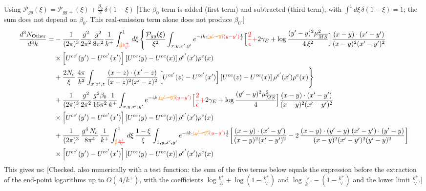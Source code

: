 \documentclass[9pt]{article}
\numberwithin{equation}{section}
\begin{document}
Using $\mathcal{P}_{gg}(\xi) = \mathcal{P}_{gg\,+}(\xi) +\frac{\beta_{0}}{2}\,\delta(1-\xi)$ {\color{red}[The $\beta_{0}$ term is added (first term) and subtracted (third term), with $\int^{1}d\xi\,\delta(1-\xi)=1$; the sum does not depend on $\beta_{0}$. This real-emission term alone does not produce $\beta_{0}$.]}
\begin{align}
\frac{d^{3}N_{\rm Other}}{d^{3}k}= &-\frac{1}{(2\pi)^{3}}\frac{g^{2}}{2\pi^{2}}\frac{g^{2}}{8\pi^{2}}\frac{1}{k^{+}}\int_{{\color{orange}\cancel{0}}{\color{red}\frac{k^{+}}{\vee}}}^{1}d\xi\,\Bigg\{\frac{\mathcal P_{gg}(\xi)}{\xi^{2}}\int_{x,y,x',y'}e^{-ik\cdot{\color{orange}\cancel{(y'-y)}}{\color{red}(y-y')}\frac{1}{\xi}}\Big[{\color{red}\frac{2}{\epsilon}+}2\gamma_{E}+\log\frac{(y'-y)^{2}\mu^{2}_{\overline{MS}}}{4\,\xi^{2}}\Big]\frac{(x-y)\cdot(x'-y')}{(x-y)^{2}(x'-y')^{2}}\notag\\
&\times\left[U^{ce'}(y') - U^{ce'}(x')\right]\left[U^{ce}(y) - U^{ce}(x)\right]\rho^{e'}(x')\rho^{e}(x)\notag\\
&+\frac{2N_{c}}{\xi}\,\frac{4\pi}{k^{2}}\int_{x,x',z}\frac{(x-z)\cdot(x'-z)}{(x-z)^{2}(x'-z)^{2}}\left[U^{ce'}(z) - U^{ce'}(x')\right]\left[U^{ce}(z) - U^{ce}(x)\right]\rho^{e'}(x')\rho^{e}(x)\Bigg\}\notag\\
&+\frac{1}{(2\pi)^{3}}\frac{g^{2}}{2\pi^{2}}\frac{g^{2}\beta_{0}}{16\pi^{2}}\frac{1}{k^{+}}\int_{x,y,x',y'}e^{-ik\cdot{\color{orange}\cancel{(y'-y)}}{\color{red}(y-y')}}\Big[{\color{red}\frac{2}{\epsilon}+}2\gamma_{E}+\log\frac{(y'-y)^{2}\mu^{2}_{\overline{MS}}}{4}\Big]\frac{(x-y)\cdot(x'-y')}{(x-y)^{2}(x'-y')^{2}}\notag\\
&\times\left[U^{ce'}(y') - U^{ce'}(x')\right]\left[U^{ce}(y) - U^{ce}(x)\right]\rho^{e'}(x')\rho^{e}(x)\notag\\
&+\frac{1}{(2\pi)^{3}}\,\frac{g^{4}\,N_{c}}{8\pi^{4}}\,\frac{1}{k^{+}}\int_{{\color{orange}\cancel{0}}{\color{red}\frac{k^{+}}{\vee}}}^{1}d\xi\,\frac{1-\xi}{\xi}\int_{x,y,x',y'}e^{-ik\cdot{\color{orange}\cancel{(y'-y)}}{\color{red}(y-y')}\frac{1}{\xi}}\bigg[\frac{(x-y)\cdot(x'-y')}{(x-y)^{2}(x'-y')^{2}}-2\,\frac{(x-y)\cdot(y'-y)\;(x'-y')\cdot(y'-y)}{(x-y)^{2}(x'-y')^{2}(y'-y)^{2}}\bigg]\notag\\
&\times\left[U^{ce'}(y') - U^{ce'}(x')\right]\left[U^{ce}(y) - U^{ce}(x)\right]\rho^{e'}(x')\rho^{e}(x)
\end{align}
This gives us: {\color{red}[Checked, also numerically with a test function: the sum of the five terms below equals the expression before the extraction of the end-point logarithms up to $O(\Lambda/k^{+})$, with the coefficients $\log\frac{k^{+}}{\Lambda}+\log(1-\frac{k^{+}}{\vee})$ and $\log\frac{\vee}{k^{+}}-(1-\frac{k^{+}}{\vee})$ and the lower limit $\frac{k^{+}}{\vee}$.]}
\end{document}
